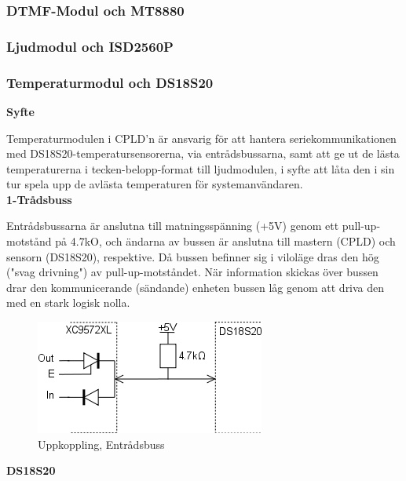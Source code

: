 \documentclass[a4paper,11pt]{article}
\begin{document}
		\subsubsection{DTMF-Modul och MT8880}
	
		\subsubsection{Ljudmodul och ISD2560P}

		\subsubsection{Temperaturmodul och DS18S20}

{\bf Syfte}

Temperaturmodulen i CPLD'n är ansvarig för att hantera seriekommunikationen med 
DS18S20-temperatursensorerna, via entrådsbussarna, samt att ge ut de lästa temperaturerna
i tecken-belopp-format till ljudmodulen, i syfte att låta den i sin tur spela upp de avlästa
temperaturen för systemanvändaren.\\

{\noindent \bf 1-Trådsbuss}

Entrådsbussarna är anslutna till matningsspänning (+5V) genom ett pull-up-motstånd på 4.7kO, och
ändarna av bussen är anslutna till mastern (CPLD) och sensorn (DS18S20), respektive. Då bussen
befinner sig i viloläge dras den hög ("svag drivning") av pull-up-motståndet. När information
skickas över bussen drar den kommunicerande (sändande) enheten bussen låg genom att driva den
med en stark logisk nolla.\\

	\begin{figure}[h!tb]
	  \centering
	      \includegraphics[scale=1, angle=0]{TempBus.png}
	  	\caption{Uppkoppling, Entrådsbuss}
	\end{figure}

{\noindent \bf DS18S20}
\end{document}
